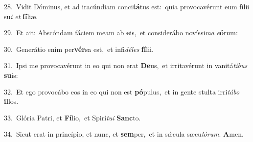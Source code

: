 {\numbfont\textcolor{\numbcolor}{28.}}~Vidit Dóminus, et ad iracúndiam conci\-\textbf{tá}\-tus est:~\star quia provocavérunt eum fílii su\textit{i} \textit{et} \textbf{fí}\-liæ.\par
{\numbfont\textcolor{\numbcolor}{29.}}~Et ait: Abscóndam fáciem meam ab \textbf{e}\-is,~\star et considerábo novíssi\textit{ma} \textit{e}\-\textbf{ó}rum:\par
{\numbfont\textcolor{\numbcolor}{30.}}~Generátio enim per\-\textbf{vér}\-sa est,~\star et infi\-\textit{dé}\-\textit{les} \textbf{fí}\-lii.\par
{\numbfont\textcolor{\numbcolor}{31.}}~Ipsi me provocavérunt in eo qui non erat \textbf{De}\-us,~\star et irritavérunt in vanitá\-\textit{ti}\-\textit{bus} \textbf{su}\-is:\par
{\numbfont\textcolor{\numbcolor}{32.}}~Et ego provocábo eos in eo qui non est \textbf{pó}\-pulus,~\star et in gente stulta irri\-\textit{tá}\-\textit{bo} \textbf{il}\-los.\par
{\numbfont\textcolor{\numbcolor}{33.}}~Glória Patri, et \textbf{Fí}\-lio,~\star et Spirí\-\textit{tu}\-\textit{i} \textbf{Sanc}\-to.\par
{\numbfont\textcolor{\numbcolor}{34.}}~Sicut erat in princípio, et nunc, et \textbf{sem}\-per,~\star et in sǽcula sæcu\-\textit{ló}\-\textit{rum}. \textbf{A}\-men.\par

